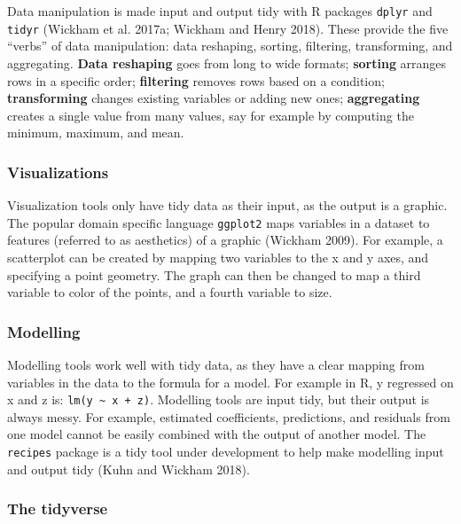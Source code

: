 \documentclass[]{article}
\theoremstyle{definition}
\theoremstyle{definition}
\theoremstyle{definition}
\theoremstyle{remark}
\begin{document}
Data manipulation is made input and output tidy with R packages
\texttt{dplyr} and \texttt{tidyr} (Wickham et al. 2017a; Wickham and
Henry 2018). These provide the five ``verbs'' of data manipulation: data
reshaping, sorting, filtering, transforming, and aggregating.
\textbf{Data reshaping} goes from long to wide formats; \textbf{sorting}
arranges rows in a specific order; \textbf{filtering} removes rows based
on a condition; \textbf{transforming} changes existing variables or
adding new ones; \textbf{aggregating} creates a single value from many
values, say for example by computing the minimum, maximum, and mean.

\hypertarget{tidy-vis}{%
\subsubsection{Visualizations}\label{tidy-vis}}

Visualization tools only have tidy data as their input, as the output is
a graphic. The popular domain specific language \texttt{ggplot2} maps
variables in a dataset to features (referred to as aesthetics) of a
graphic (Wickham 2009). For example, a scatterplot can be created by
mapping two variables to the x and y axes, and specifying a point
geometry. The graph can then be changed to map a third variable to color
of the points, and a fourth variable to size.

\hypertarget{tidy-model}{%
\subsubsection{Modelling}\label{tidy-model}}

Modelling tools work well with tidy data, as they have a clear mapping
from variables in the data to the formula for a model. For example in R,
y regressed on x and z is: \texttt{lm(y\ \textasciitilde{}\ x\ +\ z)}.
Modelling tools are input tidy, but their output is always messy. For
example, estimated coefficients, predictions, and residuals from one
model cannot be easily combined with the output of another model. The
\texttt{recipes} package is a tidy tool under development to help make
modelling input and output tidy (Kuhn and Wickham 2018).

\hypertarget{the-tidyverse}{%
\subsubsection{The tidyverse}\label{the-tidyverse}}
\end{document}
